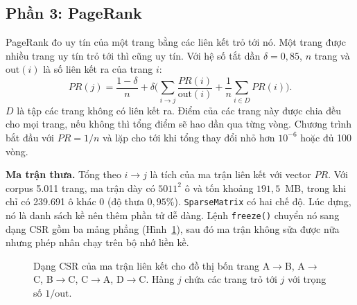 \documentclass[9pt,twocolumn,a4paper]{extarticle}
\newcommand{\code}[1]{\texttt{#1}}
\newcommand{\srcref}[1]{\par\noindent\fcolorbox{red}{white}{\footnotesize\textbf{Mã nguồn: Listing~\ref{#1} (Phụ lục~\ref{app:code}).}}\par\vspace{3pt}}
\begin{document}
\srcref{lst:bm25}

\subsection{Phần 3: PageRank}
\label{sec:pagerank}
PageRank \cite{brin1998} đo uy tín của một trang bằng các liên kết trỏ tới nó. Một trang được nhiều trang uy tín trỏ tới thì cũng uy tín. Với hệ số tắt dần $\delta=0{,}85$, $n$ trang và $\text{out}(i)$ là số liên kết ra của trang $i$:
\begin{equation}
PR(j)=\frac{1-\delta}{n}+\delta\Big(\sum_{i\to j}\frac{PR(i)}{\text{out}(i)}+\frac{1}{n}\sum_{i\in D}PR(i)\Big).
\label{eq:pagerank}
\end{equation}
$D$ là tập các trang không có liên kết ra. Điểm của các trang này được chia đều cho mọi trang, nếu không thì tổng điểm sẽ hao dần qua từng vòng. Chương trình bắt đầu với $PR=1/n$ và lặp cho tới khi tổng thay đổi nhỏ hơn $10^{-6}$ hoặc đủ 100 vòng.

\textbf{Ma trận thưa.} Tổng theo $i\to j$ là tích của ma trận liên kết với vector $PR$. Với corpus 5.011 trang, ma trận dày có $5011^2$ ô và tốn khoảng $191{,}5$~MB, trong khi chỉ có 239.691 ô khác 0 (độ thưa $0{,}95\%$). \code{SparseMatrix} có hai chế độ. Lúc dựng, nó là danh sách kề nên thêm phần tử dễ dàng. Lệnh \code{freeze()} chuyển nó sang dạng CSR gồm ba mảng phẳng (Hình~\ref{fig:csr}), sau đó ma trận không sửa được nữa nhưng phép nhân chạy trên bộ nhớ liền kề.

\begin{figure}[H]
\centering
{}
\caption{Dạng CSR của ma trận liên kết cho đồ thị bốn trang A$\to$B, A$\to$C, B$\to$C, C$\to$A, D$\to$C. Hàng $j$ chứa các trang trỏ tới $j$ với trọng số $1/\text{out}$.}
\label{fig:csr}
\end{figure}
\end{document}
